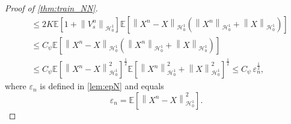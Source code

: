 \documentclass[11pt,a4paper,reqno]{amsart}
\numberwithin{equation}{section}
\theoremstyle{plain}
\theoremstyle{definition}
\def\e{{\varepsilon}}
\newcommand{\E}{\mathbb{E}}
\newcommand{\cH}{\mathcal{H}}
\newcommand{\norm}[1]{\left\|#1 \right\|} %
\begin{document}
\begin{proof}[Proof of \cref{thm:train_NN}]
\begin{align*}
    &\le 2K \E \left[ 1 + \norm{V_s^n}_{\cH_0^1} \right] \E \left[ \norm{X^n - X}_{\cH_0^1} \left(\norm{ X^n}_{\cH_0^1} + \norm{X}_{\cH_0^1} \right) \right] \\
    &\le C_\psi \E \left[  \norm{X^n - X}_{\cH_0^1} \left( \norm{ X^n}_{\cH_0^1} + \norm{X}_{\cH_0^1} \right) \right] \\
    &\le  C_\psi \E \left[ \norm{ X^n-X}_{\cH_0^1}^2 \right]^{\frac{1}{2}} \E \left[ \norm{ X^n}^2_{\cH_0^1} + \norm{ X}^2_{\cH_0^1} \right]^{\frac{1}{2}} 
     \le C_\psi \, \e_n^{\frac{1}{2}},
\end{align*}
where $\e_n$ is defined in \cref{lem:epN} and equals
\[
    \e_n = \E \left[ \norm{ X^n-X}_{\cH_0^1}^2 \right].
\]



\end{proof}
\end{document}
